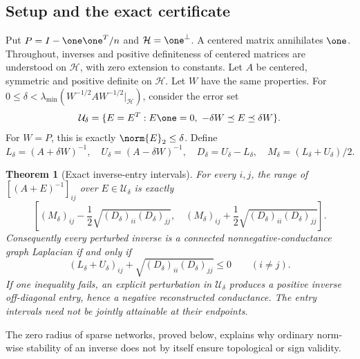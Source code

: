 \documentclass[11pt,a4paper]{article}
\newtheorem{theorem}{Theorem}[section]
\theoremstyle{definition}\newtheorem{definition}[theorem]{Definition}
\theoremstyle{remark}\newtheorem{remark}[theorem]{Remark}
\numberwithin{equation}{section}
\begin{document}
\subsection{Setup and the exact certificate}\label{T07-sec-1}
Put $P=I-\one\one^T/n$ and $\mathcal H=\one^\perp$. A centered matrix annihilates $\one$. Throughout, inverses and positive definiteness of centered matrices are understood on $\mathcal H$, with zero extension to constants. Let $A$ be centered, symmetric and positive definite on $\mathcal H$. Let $W$ have the same properties. For $0\le\delta<\lambda_{\min}(W^{-1/2}AW^{-1/2}|_{\mathcal H})$, consider the error set
\[
 \mathcal U_\delta=\{E=E^T:E\one=0,\ -\delta W\preceq E\preceq\delta W\}.
\]
For $W=P$, this is exactly $\norm{E}_2\le\delta$. Define
\[
 L_\delta=(A+\delta W)^{-1},\quad U_\delta=(A-\delta W)^{-1},
 \quad D_\delta=U_\delta-L_\delta,\quad M_\delta=(L_\delta+U_\delta)/2.
\]
\begin{theorem}[Exact inverse-entry intervals]\label{T07-entries}
For every $i,j$, the range of $[(A+E)^{-1}]_{ij}$ over $E\in\mathcal U_\delta$ is exactly
\[
 \left[(M_\delta)_{ij}-\frac12\sqrt{(D_\delta)_{ii}(D_\delta)_{jj}},\quad
 (M_\delta)_{ij}+\frac12\sqrt{(D_\delta)_{ii}(D_\delta)_{jj}}\right].
\]
Consequently every perturbed inverse is a connected nonnegative-conductance graph Laplacian if and only if
\begin{equation}\label{T07-criterion}
 (L_\delta+U_\delta)_{ij}+\sqrt{(D_\delta)_{ii}(D_\delta)_{jj}}\le0
 \qquad(i\ne j).
\end{equation}
If one inequality fails, an explicit perturbation in $\mathcal U_\delta$ produces a positive inverse off-diagonal entry, hence a negative reconstructed conductance. The entry intervals need not be jointly attainable at their endpoints.
\end{theorem}
The zero radius of sparse networks, proved below, explains why ordinary norm-wise stability of an inverse does not by itself ensure topological or sign validity.
\end{document}
